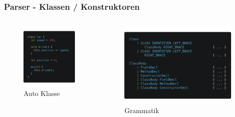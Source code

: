 \begin{frame}
	\frametitle{Parser - Klassen / Konstruktoren}
	\begin{columns}[T]
	\begin{column}{.48\textwidth}

	\begin{figure}[H]
		\centering
		\includegraphics[width=0.6\linewidth]{images/parser/car-class.png}
		\caption{Auto Klasse}
		\label{fig:images/parser/car-class}
	\end{figure}
	\end{column}%
	\hfill%
	\begin{column}{.48\textwidth}

	\pause
	\begin{figure}[H]
		\centering
		\includegraphics[width=0.95\linewidth]{images/parser/class-ast.png}
		\caption{Grammatik}
		\label{fig:images/parser/class-ast}
	\end{figure}
	\end{column}%
	\end{columns}
\end{frame}

